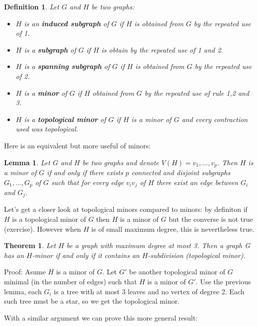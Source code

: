 \documentclass[12pt,a4paper]{article}
\newtheorem{theorem}{Theorem}
\newtheorem{lemma}{Lemma}
\newtheorem{definition}{Definition}
\begin{document}
\begin{definition}
Let $G$ and $H$ be two graphs:
\begin{itemize}
\item $H$ is an \textbf{induced subgraph} of $G$ if $H$ is obtained from $G$ by
  the repeated use of 1.
\item $H$ is a \textbf{subgraph }of $G$ if $H$ is obtain by the repeated use of
  1 and 2.
\item $H$ is a \textbf{spanning subgraph} of $G$ if $H$ is obtained from $G$ by
  the repeated use of 2.
\item $H$ is a \textbf{minor} of $G$ if $H$ obtained from $G$ by the repeated
  use of rule 1,2 and 3.
\item $H$ is a \textbf{topological minor} of $G$ if $H$ is a minor of $G$ and
  every contraction used was topological.
\end{itemize}
\end{definition}

Here is an equivalent but more useful of minors:

\begin{lemma}
  Let $G$ and $H$ be two graphs and denote $V(H) = {v_1, \dots, v_p}$. Then $H$
  is a minor of $G$ if and only if there exists $p$ connected and disjoint
  subgraphs $G_1, \dots, G_p$ of $G$ such that for every edge $v_iv_j$ of $H$
  there exist an edge between $G_i$ and $G_j$.
\end{lemma}


Let's get a closer look at topological minors compared to minors: by definiton
if $H$ is a topological minor of $G$ then $H$ is a minor of $G$ but the converse
is not true (exercise). However when $H$ is of small maximum degree, this is
nevertheless true.

\begin{theorem}
  Let $H$ be a graph with maximum degree at most 3. Then a graph G has an
  $H$-minor if and only if it contains an $H$-subdivision (topological minor).
\end{theorem}

Proof: Asume $H$ is a minor of $G$. Let $G'$ be another topological minor of $G$
minimal (in the number of edges) such that $H$ is a minor of $G'$. Use the
previous lemma, each $G_i$ is a tree with at most 3 leaves and no vertex of
degree 2. Each such tree must be a star, so we get the topological minor.


With a similar argument we can prove this more general result:
\end{document}
